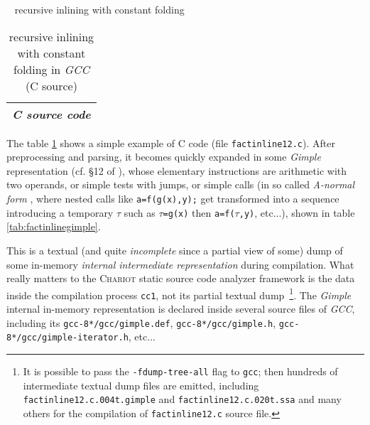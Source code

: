 \bigskip

\bigskip

{{\raisebox{3pt}{\textcolor{brown}{\rule{0.2\textwidth}{2.0pt}}}} ~ \large{recursive inlining with constant folding}}



\begin{table}[!htbp]
\caption{\label{tab:factinlinecsrc} recursive inlining with constant folding in \emph{GCC} (C source)}
   \medskip
  \begin{center}
    \begin{relsize}{-1.2}
     \begin{tabular}{c}
       \\ 
       \textbf{\emph{C source code}} \\ 
       \hline
     \end{tabular}
    \end{relsize}
  \end{center}
\end{table}

The table \ref{tab:factinlinecsrc} shows a simple example of C code
(file \texttt{factinline12.c}). After preprocessing and parsing, it
becomes quickly expanded in some \emph{Gimple}
representation (cf. \S12 of \cite{gcc-internals}), whose elementary
instructions are arithmetic with two operands, or simple tests with
jumps, or simple calls (in so called \emph{A-normal form}
, where nested calls like \verb+a=f(g(x),y);+ get
transformed into a sequence introducing a temporary $\tau$ such as
$\tau$\verb+=g(x)+ then \verb+a=f(+$\tau$\verb+,y)+, etc...), shown in
table \ref{tab:factinlinegimple}.



This is a textual (and quite
\emph{incomplete} since a partial view of some) dump of some in-memory
\emph{internal intermediate representation} during compilation. What
really matters to the \textsc{Chariot} static source code analyzer
framework is the data inside the compilation process \texttt{cc1}, not
its partial textual dump~\footnote{It is possible to pass the
  \texttt{-fdump-tree-all} flag to \texttt{gcc}; then hundreds of
  intermediate textual dump files are emitted, including
  \texttt{factinline12.c.004t.gimple} and
  \texttt{factinline12.c.020t.ssa} and many others for the compilation
  of \texttt{factinline12.c} source file.}. The \emph{Gimple} internal
in-memory representation is declared inside several source files of
\emph{GCC}, including its \texttt{gcc-8*/gcc/gimple.def},
\texttt{gcc-8*/gcc/gimple.h},
\texttt{gcc-8*/gcc/gimple-iterator.h}, etc...



